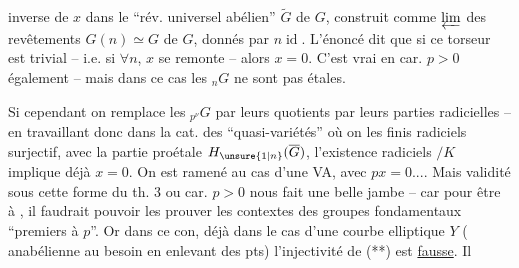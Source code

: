 inverse de $x$ dans le ``rév. universel abélien'' $\widetilde G$ de $G$, construit comme $\varprojlim$ des revêtements $G(n)\simeq G$ de $G$, donnés par $n\operatorname{id}$. L'énoncé dit que si ce torseur est trivial -- i.e. si $\forall n$, $x$ se remonte -- alors $x=0$. C'est vrai en car. $p>0$ également -- mais dans ce cas les ${}_nG$ ne sont pas étales.


Si cependant on remplace les ${}_{p^\nu}G$ par leurs quotients par leurs parties radicielles -- en travaillant donc dans la cat. des ``quasi-variétés'' où on   les   finis radiciels surjectif,   avec la partie proétale  $H_{\unsure{1|n}}(\overline G)$,  l'existence   radiciels $/K$ implique déjà $x=0$.  On est ramené au cas d'une VA, avec $px=0$.... Mais  validité sous cette forme du th. 3 ou  car. $p>0$ nous fait une belle jambe -- car pour être à , il faudrait pouvoir les prouver   les contextes des groupes fondamentaux ``premiers à $p$''. Or dans ce con, déjà dans le cas d'une courbe elliptique $Y$ (  anabélienne au besoin en enlevant des pts) l'injectivité de (**) est \uline{fausse}. Il


